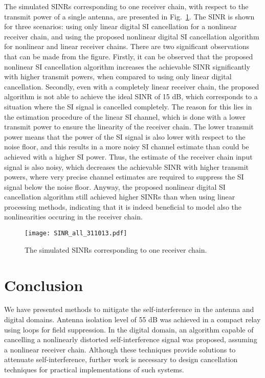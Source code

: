 \documentclass[conference,twoside,letterpaper,10pt]{IEEEtran}
\begin{document}
The simulated SINRs corresponding to one receiver chain, with respect to the transmit power of a single antenna, are presented in Fig.~\ref{fig:sinr_simul}. The SINR is shown for three scenarios: using only linear digital SI cancellation for a nonlinear receiver chain, and using the proposed nonlinear digital SI cancellation algorithm for nonlinear and linear receiver chains. There are two significant observations that can be made from the figure. Firstly, it can be observed that the proposed nonlinear SI cancellation algorithm increases the achievable SINR significantly with higher transmit powers, when compared to using only linear digital cancellation. Secondly, even with a completely linear receiver chain, the proposed algorithm is not able to achieve the ideal SINR of 15 dB, which corresponds to a situation where the SI signal is cancelled completely. The reason for this lies in the estimation procedure of the linear SI channel, which is done with a lower transmit power to ensure the linearity of the receiver chain. The lower transmit power means that the power of the SI signal is also lower with respect to the noise floor, and this results in a more noisy SI channel estimate than could be achieved with a higher SI power. Thus, the estimate of the receiver chain input signal is also noisy, which decreases the achievable SINR with higher transmit powers, where very precise channel estimates are required to suppress the SI signal below the noise floor. Anyway, the proposed nonlinear digital SI cancellation algorithm still achieved higher SINRs than when using linear processing methods, indicating that it is indeed beneficial to model also the nonlinearities occuring in the receiver chain.

\begin{figure}[!t]
\centering
\texttt{[image: SINR\_all\_311013.pdf]}
\caption{The simulated SINRs corresponding to one receiver chain.}
\label{fig:sinr_simul}
\vspace{-5mm}
\end{figure}


\vspace{-2.5mm}
\section{Conclusion}
\label{sec:conc}
\vspace{-1mm}
We have presented methods to mitigate the self-interference in the antenna and digital domains. Antenna isolation level of 55 dB was achieved in a compact relay using loops for field suppression. In the digital domain, an algorithm capable of cancelling a nonlinearly distorted self-interference signal was proposed, assuming a nonlinear receiver chain. Although these techniques provide solutions to attenuate self-interference, further work is necessary to design cancellation techniques for practical implementations of such systems.




















\ifCLASSOPTIONcaptionsoff
  \newpage
\fi



\end{document}
